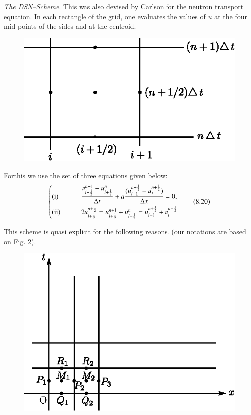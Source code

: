 \begin{exam}\label{chap8:exam8.8}
{\em The DSN--Scheme}. This was also devised by Carlson for the neutron transport equation. In each rectangle of the grid, one evaluates the values of $u$ at the four mid-points of the sides and at the centroid.

\begin{figure}[H]
\centering
\includegraphics{figures/fig52-8.6.eps}
\caption{}\label{c8:fig8.6}
\end{figure}

For\pageoriginale this we use the set of three equations given below:
\begin{equation*}
\begin{cases}
{\rm (i)}  \qquad & \dfrac{u^{n+1}_{i+\frac{1}{2}} - u^n_{i+\frac{1}{2}}}{\Delta t} + a \dfrac{(u^{n+\frac{1}{2}}_{i+1} - u^{n+\frac{1}{2}}_i)}{\Delta x} = 0,\\[6pt] 
{\rm (ii)} \qquad &  2u^{n+\frac{1}{2}}_{i+\frac{1}{2}} = u^{n+1}_{i+\frac{1}{2}} + u^n_{i+\frac{1}{2}} = u^{n+\frac{1}{2}}_{i+1} + u^{n+\frac{1}{2}}_i 
\end{cases}
\tag{8.20}\label{eq8.20}
\end{equation*}

This scheme is quasi explicit for the following reasons. (our
notations are based on Fig. \ref{c8:fig8.7}). 

\begin{figure}[H]
\centering
\includegraphics{figures/fig52-8.7.eps}
\caption{}\label{c8:fig8.7}
\end{figure}


\end{exam}
